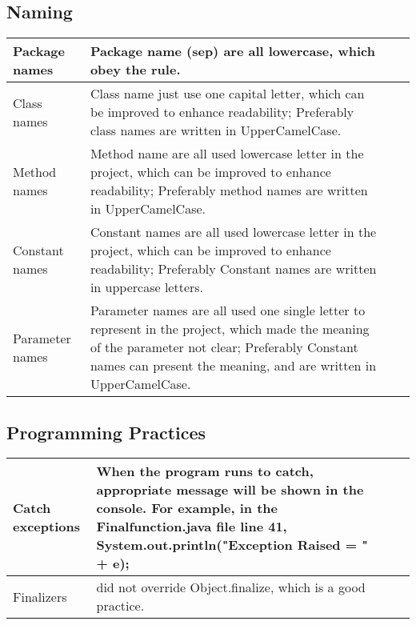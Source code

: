 \documentclass[a4paper, 11pt]{article}
\begin{document}
\subsection{Naming}
\indent
\begin{center}
\renewcommand\arraystretch{2.0}
\begin{tabularx}{\textwidth}{|%
   >{\hsize=1.0\hsize}X|
   >{\hsize=2.0\hsize}X|
   >{\hsize=0.5\hsize}X|
   >{\hsize=0.5\hsize}X|}
\hline
Package names & Package name (sep) are all lowercase, which obey the rule.  \\

\hline
 Class names & Class name just use one capital letter, which can be improved to enhance readability; Preferably class names are written in UpperCamelCase.\\

\hline
Method names & Method name are all used lowercase letter in the project, which can be improved to enhance readability; Preferably method names are written in UpperCamelCase.\\

\hline
Constant names & Constant names are all used lowercase letter in the project, which can be improved to enhance readability; Preferably Constant names are written in uppercase letters.\\

\hline
Parameter names & Parameter names are all used one single letter to represent in the project, which made the meaning of the parameter not clear; Preferably Constant names can present the meaning, and are written in UpperCamelCase.\\

\hline
\end{tabularx}
\end{center}
\indent


\subsection{Programming Practices}
\indent
\begin{center}
\renewcommand\arraystretch{2.0}
\begin{tabularx}{\textwidth}{|%
   >{\hsize=1.0\hsize}X|
   >{\hsize=2.0\hsize}X|
   >{\hsize=0.5\hsize}X|
   >{\hsize=0.5\hsize}X|}
\hline
Catch exceptions & When the program runs to catch, appropriate message will be shown in the console. For example, in the Finalfunction.java file line 41, System.out.println("Exception Raised = " + e); \\

\hline
Finalizers & did not override Object.finalize, which is a good practice. \\


\hline
\end{tabularx}
\end{center}
\indent
\end{document}
